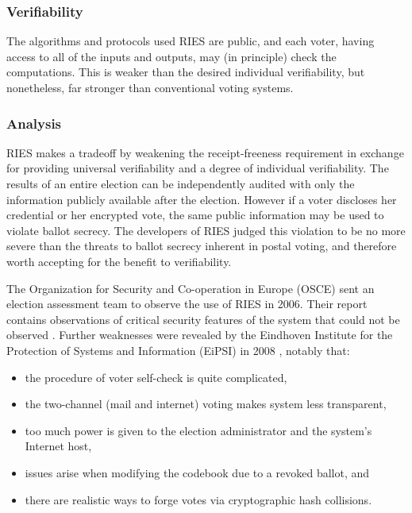\subsubsection{Verifiability}

The algorithms and protocols used RIES are public, and each voter,
having access to all of the inputs and outputs, may (in principle)
check the computations. This is weaker than the desired individual
verifiability, but nonetheless, far stronger than
conventional voting systems.

\subsubsection{Analysis}

RIES makes a tradeoff by weakening the receipt-freeness requirement in
exchange for providing universal verifiability and a degree of
individual verifiability. The results of an entire election can be
independently audited with only the information publicly available
after the election. However if a voter discloses her credential or her
encrypted vote, the same public information may be used to violate
ballot secrecy. The developers of RIES judged this violation to be no
more severe than the threats to ballot secrecy inherent in postal
voting, and therefore worth accepting for the benefit to
verifiability.

The Organization for Security and Co-operation in Europe (OSCE) sent
an election assessment team to observe the use of RIES in 2006.  Their
report contains observations of critical security features of the
system that could not be observed \cite{osce2007}. Further
weaknesses were revealed by the Eindhoven Institute for the Protection
of Systems and Information (EiPSI) in 2008 \cite{hubbers2008},
notably that:

\begin{itemize}
  \item the procedure of voter self-check is quite complicated,
  \item the two-channel (mail and internet) voting makes system less
    transparent,
  \item too much power is given to the election administrator and the
    system's Internet host,
  \item issues arise when modifying the codebook due to a revoked
    ballot, and
  \item there are realistic ways to forge votes via cryptographic hash
    collisions.
\end{itemize}

